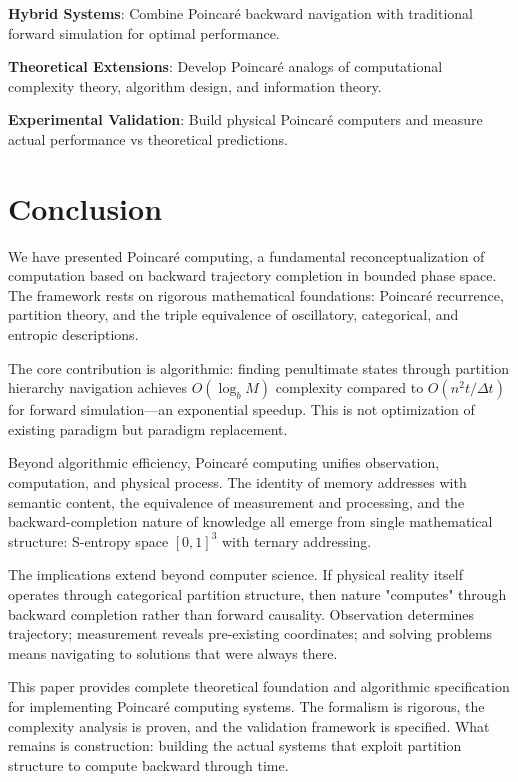 \documentclass[twocolumn,10pt]{article}
\begin{document}
\textbf{Hybrid Systems}: Combine Poincaré backward navigation with traditional forward simulation for optimal performance.

\textbf{Theoretical Extensions}: Develop Poincaré analogs of computational complexity theory, algorithm design, and information theory.

\textbf{Experimental Validation}: Build physical Poincaré computers and measure actual performance vs theoretical predictions.

\section{Conclusion}

We have presented Poincaré computing, a fundamental reconceptualization of computation based on backward trajectory completion in bounded phase space. The framework rests on rigorous mathematical foundations: Poincaré recurrence, partition theory, and the triple equivalence of oscillatory, categorical, and entropic descriptions.

The core contribution is algorithmic: finding penultimate states through partition hierarchy navigation achieves $O(\log_b M)$ complexity compared to $O(n^2 t/\Delta t)$ for forward simulation—an exponential speedup. This is not optimization of existing paradigm but paradigm replacement.

Beyond algorithmic efficiency, Poincaré computing unifies observation, computation, and physical process. The identity of memory addresses with semantic content, the equivalence of measurement and processing, and the backward-completion nature of knowledge all emerge from single mathematical structure: S-entropy space $[0,1]^3$ with ternary addressing.

The implications extend beyond computer science. If physical reality itself operates through categorical partition structure, then nature "computes" through backward completion rather than forward causality. Observation determines trajectory; measurement reveals pre-existing coordinates; and solving problems means navigating to solutions that were always there.

This paper provides complete theoretical foundation and algorithmic specification for implementing Poincaré computing systems. The formalism is rigorous, the complexity analysis is proven, and the validation framework is specified. What remains is construction: building the actual systems that exploit partition structure to compute backward through time.
\end{document}
